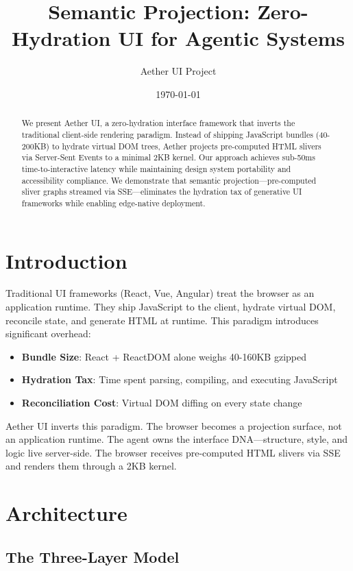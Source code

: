 \documentclass[11pt]{article}
\title{Semantic Projection: Zero-Hydration UI for Agentic Systems}
\author{Aether UI Project}
\date{\today}
\begin{document}
\maketitle

\begin{abstract}
We present Aether UI, a zero-hydration interface framework that inverts the traditional client-side rendering paradigm. Instead of shipping JavaScript bundles (40-200KB) to hydrate virtual DOM trees, Aether projects pre-computed HTML slivers via Server-Sent Events to a minimal 2KB kernel. Our approach achieves sub-50ms time-to-interactive latency while maintaining design system portability and accessibility compliance. We demonstrate that semantic projection—pre-computed sliver graphs streamed via SSE—eliminates the hydration tax of generative UI frameworks while enabling edge-native deployment.
\end{abstract}

\section{Introduction}

Traditional UI frameworks (React, Vue, Angular) treat the browser as an application runtime. They ship JavaScript to the client, hydrate virtual DOM, reconcile state, and generate HTML at runtime. This paradigm introduces significant overhead:

\begin{itemize}
  \item \textbf{Bundle Size}: React + ReactDOM alone weighs 40-160KB gzipped
  \item \textbf{Hydration Tax}: Time spent parsing, compiling, and executing JavaScript
  \item \textbf{Reconciliation Cost}: Virtual DOM diffing on every state change
\end{itemize}

Aether UI inverts this paradigm. The browser becomes a projection surface, not an application runtime. The agent owns the interface DNA—structure, style, and logic live server-side. The browser receives pre-computed HTML slivers via SSE and renders them through a 2KB kernel.

\section{Architecture}

\subsection{The Three-Layer Model}
\end{document}
